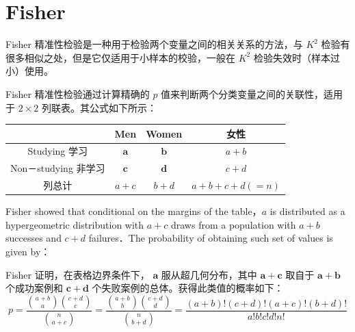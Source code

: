 \section{Fisher}

\begin{definition}
    Fisher 精准性检验是一种用于检验两个变量之间的相关关系的方法，与 $K^2$ 检验有很多相似之处，但是它仅适用于小样本的校验，一般在 $K^2$ 检验失效时（样本过小）使用。

    Fisher 精准性检验通过计算精确的 $p$ 值来判断两个分类变量之间的关联性，适用于 $2 \times 2$ 列联表。其公式如下所示：

    \begin{center}
        \begin{tabular}{|c|c|c|c|}
            \hline                  & Men              & Women            & 女性            \\
            \hline Studying 学习      & $\boldsymbol{a}$ & $\boldsymbol{b}$ & $a+b$         \\
            \hline Non－studying 非学习 & $\boldsymbol{c}$ & $\boldsymbol{d}$ & $c+d$         \\
            \hline 列总计              & $a+c$            & $b+d$            & $a+b+c+d(=n)$ \\
            \hline
        \end{tabular}
    \end{center}

    Fisher showed that conditional on the margins of the table，$a$ is distributed as a hypergeometric distribution with $a+c$ draws from a population with $a+b$ successes and $c+d$ failures．The probability of obtaining such set of values is given by：

    Fisher 证明，在表格边界条件下， $\boldsymbol{a}$ 服从超几何分布，其中 $\boldsymbol{a}+\boldsymbol{c}$ 取自于 $\boldsymbol{a}+\boldsymbol{b}$ 个成功案例和 $\boldsymbol{c}+\boldsymbol{d}$ 个失败案例的总体。获得此类值的概率如下：
    $$
        p=\frac{\binom{a+b}{a}\binom{c+d}{c}}{\binom{n}{a+c}}=\frac{\binom{a+b}{b}\binom{c+d}{d}}{\binom{n}{b+d}}=\frac{(a+b)!(c+d)!(a+c)!(b+d)!}{a!b!c!d!n!}
    $$
\end{definition}

